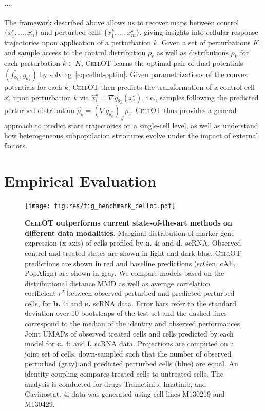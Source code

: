 \paragraph{...}
The framework described above allows us to recover maps between control $\{ x_1^c, \dots, x_n^c \}$ and perturbed cells $\{ x_1^k, \dots, x_m^k \}$, giving insights into cellular response trajectories upon application of a perturbation $k$.
Given a set of perturbations $K$, and sample access to the control distribution $\rho_c$ as well as  distributions $\rho_k$ for each perturbation $k \in K$, \textsc{CellOT} learns the optimal pair of dual potentials $(f_{\phi_k}^*, g_{\theta_k^*})$ by solving~\eqref{eq:cellot-optim}.
Given parametrizations of the convex potentials for each $k$, \textsc{CellOT} then predicts the transformation of a control cell $x_i^c$ upon perturbation $k$ via $\hat{x}_i^k = \nabla g_{\theta_k^\star}(x_i^c)$, i.e., samples following the predicted perturbed distribution $\hat{\rho_k} =(\nabla g_{\theta_k^*})_{\#} \rho_{c}$. 
\textsc{CellOT} thus provides a general approach to predict state trajectories on a single-cell level,
as well as understand how heterogeneous subpopulation structures evolve under the impact of external factors.



\section{Empirical Evaluation}

\begin{figure}
    \centering
    \texttt{[image: figures/fig\_benchmark\_cellot.pdf]}
    \caption{ \textbf{\textsc{CellOT} outperforms current state-of-the-art methods on different data modalities.}  Marginal distribution of marker gene expression (x-axis) of cells profiled by \textbf{a.} 4i and \textbf{d.} scRNA. Observed control and treated states are shown in light and dark blue. \textsc{CellOT} predictions are shown in red and baseline predictions (scGen, cAE, PopAlign) are shown in gray. We compare models based on the distributional distance \acrshort{MMD} as well as average correlation coefficient $r^2$ between observed perturbed and predicted perturbed cells, for \textbf{b.} 4i and \textbf{e.} scRNA data. Error bars refer to the standard deviation over 10 bootstraps of the test set and the dashed lines correspond to the median of the identity and observed performances. Joint UMAPs of observed treated cells and cells predicted by each model for \textbf{c.} 4i and \textbf{f.} scRNA data. Projections are computed on a joint set of cells, down-sampled such that the number of observed perturbed (gray) and predicted perturbed cells (blue) are equal. An identity coupling compares treated cells to untreated cells. The analysis is conducted for drugs Trametinib, Imatinib, and Gavinostat. 4i data was generated using cell lines M130219 and M130429.}
    \label{fig:benchmark_cellot}
\end{figure}

